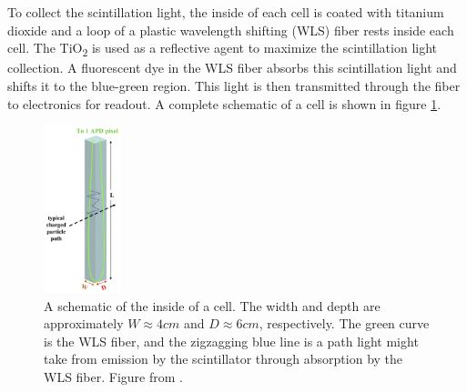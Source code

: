 To collect the scintillation light, the inside of each cell is coated with titanium dioxide and a loop of a plastic wavelength shifting (WLS) fiber rests inside each cell. The TiO\textsubscript{2} is used as a reflective agent to maximize the scintillation light collection. A fluorescent dye in the WLS fiber absorbs this scintillation light and shifts it to the blue-green region. This light is then transmitted through the fiber to electronics for readout. A complete schematic of a cell is shown in figure \ref{fig:DetCell}.
\begin{figure}[htb]
  \centering
  \includegraphics[width=0.2\textwidth]{figures/DetCell.png}
  \caption[A Detector Cell]{A schematic of the inside of a cell. The width and depth are approximately $W \approx 4\unit{cm}$ and $D \approx 6\unit{cm}$, respectively. The green curve is the WLS fiber, and the zigzagging blue line is a path light might take from emission by the scintillator through absorption by the WLS fiber. Figure from \cite{ref:TDRNOvA}.}
  \label{fig:DetCell}
\end{figure}

